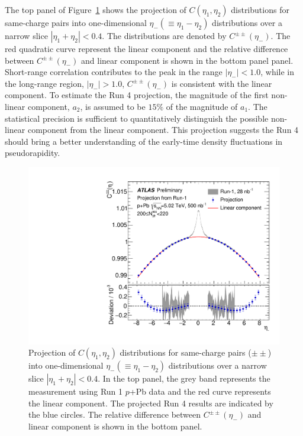 The top panel of Figure~\ref{fig:fbcorr_ATLAS_a1_run4} shows the projection of $C(\eta_1, \eta_2)$ distributions for same-charge pairs into one-dimensional $\eta_-(\equiv \eta_1 - \eta_2)$ distributions over a narrow slice $|\eta_1 + \eta_2|<0.4$. The distributions are denoted by $C^{\pm\pm}(\eta_-)$. The red quadratic curve represent the linear component and the relative difference between $C^{\pm\pm}(\eta_-)$ and linear component is shown in the bottom panel panel. Short-range correlation contributes to the peak in the range $|\eta_-|<1.0$, while in the long-range region, $|\eta_-|>1.0$, $C^{\pm\pm}(\eta_-)$ is consistent with the linear component. To estimate the Run 4 projection, the magnitude of the first non-linear component, $a_2$, is assumed to be $15\%$ of  the magnitude of $a_1$. The statistical precision is sufficient to quantitatively distinguish the possible non-linear component from the linear component. This projection suggests the Run 4 should bring a better understanding of the early-time density fluctuations in pseudorapidity.

\begin{figure}[H]
\centering
\includegraphics[width=.7\linewidth]{figs/chapter_fbcorr/ATLAS_a1_run4.pdf}
\caption{Projection of $C(\eta_1, \eta_2)$ distributions for same-charge pairs ($\pm\pm$) into one-dimensional $\eta_-(\equiv \eta_1 - \eta_2)$ distributions over a narrow slice $|\eta_1 + \eta_2| < 0.4$. In the top panel, the grey band represents the measurement using Run 1 $p$+Pb data and the red curve represents the linear component. The projected Run 4 results are indicated by the blue circles. The relative difference between $C^{\pm\pm}(\eta_-)$ and linear component is shown in the bottom panel.}
\label{fig:fbcorr_ATLAS_a1_run4}
\end{figure}


